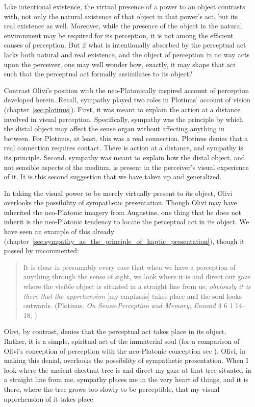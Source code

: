 Like intentional existence, the virtual presence of a power to an object contrasts with, not only the natural existence of that object in that power's act, but its real existence as well. Moreover, while the presence of the object in the natural environment may be required for its perception, it is not among the efficient causes of perception. But if what is intentionally absorbed by the perceptual act lacks both natural and real existence, and the object of perception in no way acts upon the perceiver, one may well wonder how, exactly, it may shape that act such that the perceptual act formally assimilates to its object?

Contrast Olivi's position with the neo-Platonically inspired account of perception developed herein. Recall, sympathy played two roles in Plotinus' account of vision (chapter~\ref{sec:plotinus}). First, it was meant to explain the action at a distance involved in visual perception. Specifically, sympathy was the principle by which the distal object may affect the sense organ without affecting anything in between. For Plotinus, at least, this was a real connection. Plotinus denies that a real connection requires contact. There is action at a distance, and sympathy is its principle. Second, sympathy was meant to explain how the distal object, and not sensible aspects of the medium, is present in the perceiver's visual experience of it. It is this second suggestion that we have taken up and generalized. 

In taking the visual power to be merely virtually present to its object, Olivi overlooks the possibility of sympathetic presentation. Though Olivi may have inherited the neo-Platonic imagery from Augustine, one thing that he does not inherit is the neo-Platonic tendency to locate the perceptual act in its object. We have seen an example of this already (chapter~\ref{sec:sympathy_as_the_principle_of_haptic_presentation}), though it passed by uncommented: 
\begin{quote}
	It is clear in presumably every case that when we have a perception of anything through the sense of sight, we look where it is and direct our gaze where the visible object is situated in a straight line from us; \emph{obviously it is there that the apprehension} [my emphasis] takes place and the soul looks outwards. (Plotinus, \emph{On Sense-Perception and Memory}, \emph{Ennead} 4 6 1 14--18; \citealt[321]{Armstrong:1984aa})
\end{quote}
Olivi, by contrast, denies that the perceptual act takes place in its object. Rather, it is a simple, spiritual act of the immaterial soul (for a comparison of Olivi's conception of perception with the neo-Platonic conception see \citealt[151]{Toivanen:2013ul}). Olivi, in making this denial, overlooks the possibility of sympathetic presentation. When I look where the ancient chestnut tree is and direct my gaze at that tree situated in a straight line from me, sympathy places me in the very heart of things, and it is there, where the tree grows too slowly to be perceptible, that my visual apprehension of it takes place.

